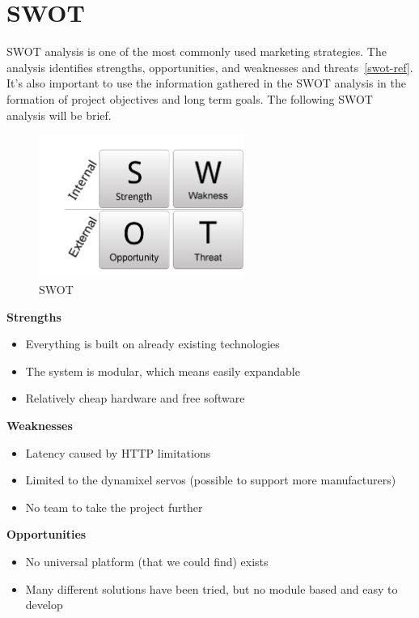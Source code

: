 \chapter{SWOT}
SWOT analysis is one of the most commonly used marketing strategies. 
The analysis identifies strengths, opportunities, and weaknesses and threats~\ref{swot-ref}.
It's also important to use the information gathered in the SWOT analysis in the formation of project objectives and long term goals. 
The following SWOT analysis will be brief.
\vspace{\secspace}

\begin{figure}[H]
    \centering
    \includegraphics[width=0.6\textwidth]{graphics/swot.png}	
    \caption{SWOT}
    \label{fig:sw}
\end{figure}

\textbf{\Large Strengths}
\begin{itemize}
	 \item Everything is built on already existing technologies
	 \item The system is modular, which means easily expandable
	 \item Relatively cheap hardware and free software
\end{itemize}

\textbf{\Large Weaknesses}
\begin{itemize}
	 \item Latency caused by HTTP limitations
	 \item Limited to the dynamixel servos (possible to support more manufacturers)
	 \item No team to take the project further
\end{itemize}

\textbf{\Large Opportunities}
\begin{itemize}
	 \item No universal platform (that we could find) exists
	 \item Many different solutions have been tried, but no module based and easy to develop
\end{itemize}

